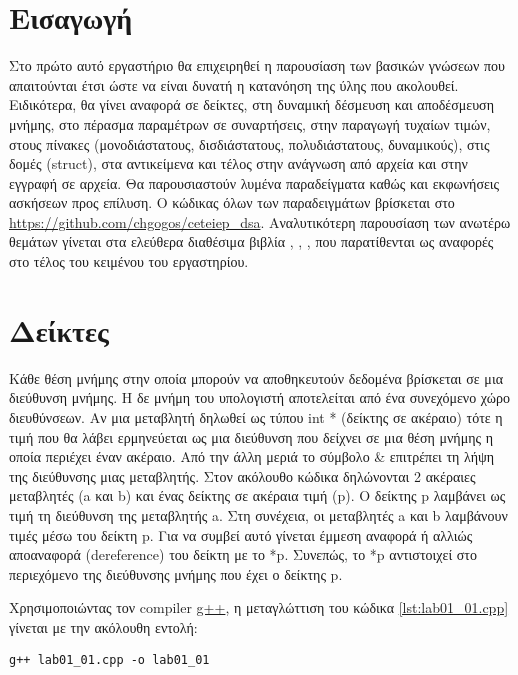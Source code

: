 \section{Εισαγωγή}
Στο πρώτο αυτό εργαστήριο θα επιχειρηθεί η παρουσίαση των βασικών γνώσεων που απαιτούνται έτσι ώστε να είναι δυνατή η κατανόηση της ύλης που ακολουθεί. Ειδικότερα, θα γίνει αναφορά σε δείκτες, στη δυναμική δέσμευση και αποδέσμευση μνήμης, στο πέρασμα παραμέτρων σε συναρτήσεις, στην παραγωγή τυχαίων τιμών, στους πίνακες (μονοδιάστατους, δισδιάστατους, πολυδιάστατους, δυναμικούς), στις δομές (struct), στα αντικείμενα και τέλος στην ανάγνωση από αρχεία και στην εγγραφή σε αρχεία. Θα παρουσιαστούν λυμένα παραδείγματα καθώς και εκφωνήσεις ασκήσεων προς επίλυση. Ο κώδικας όλων των παραδειγμάτων βρίσκεται στο \href{https://github.com/chgogos/ceteiep_dsa}{https://github.com/chgogos/ceteiep\_dsa}. Αναλυτικότερη παρουσίαση των ανωτέρω θεμάτων γίνεται στα ελεύθερα διαθέσιμα βιβλία \cite{stamatiadis2017}, \cite{downey2012}, \cite{soulie2007}, \cite{hall2007} που παρατίθενται ως αναφορές στο τέλος του κειμένου του εργαστηρίου. 

\section{Δείκτες}
Κάθε θέση μνήμης στην οποία μπορούν να αποθηκευτούν δεδομένα βρίσκεται σε μια διεύθυνση μνήμης. Η δε μνήμη του υπολογιστή αποτελείται από ένα συνεχόμενο χώρο διευθύνσεων. Αν μια μεταβλητή δηλωθεί ως τύπου int * (δείκτης σε ακέραιο) τότε η τιμή που θα λάβει ερμηνεύεται ως μια διεύθυνση που δείχνει σε μια θέση μνήμης η οποία περιέχει έναν ακέραιο. Από την άλλη μεριά το σύμβολο \& επιτρέπει τη λήψη της διεύθυνσης μιας μεταβλητής. Στον ακόλουθο κώδικα δηλώνονται 2 ακέραιες μεταβλητές (a και b) και ένας δείκτης σε ακέραια τιμή (p). Ο δείκτης p λαμβάνει ως τιμή τη διεύθυνση της μεταβλητής a. Στη συνέχεια, οι μεταβλητές a και b λαμβάνουν τιμές μέσω του δείκτη p. Για να συμβεί αυτό γίνεται έμμεση αναφορά ή αλλιώς αποαναφορά (dereference) του δείκτη με το *p. Συνεπώς, το *p αντιστοιχεί στο περιεχόμενο της διεύθυνσης μνήμης που έχει ο δείκτης p.



Χρησιμοποιώντας τον compiler \href{https://gcc.gnu.org/}{g++}, η μεταγλώττιση του κώδικα \ref{lst:lab01_01.cpp} γίνεται με την ακόλουθη εντολή:
\begin{lstlisting}[style=DOS]
g++ lab01_01.cpp -o lab01_01
\end{lstlisting}

